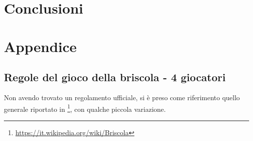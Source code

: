 \documentclass[a4paper,12pt]{article}
\begin{document}
\section{Conclusioni} \label{conclusions}

\fancyhead{}
\renewcommand{\headrulewidth}{0pt}
\appendix
{}
\section*{Appendice}

\subsection*{Regole del gioco della briscola - 4 giocatori}\label{briscola-rules}

Non avendo trovato un regolamento ufficiale, si è preso come riferimento quello generale riportato in \footnote{\url{https://it.wikipedia.org/wiki/Briscola}}, con qualche piccola variazione.
 
\end{document}
